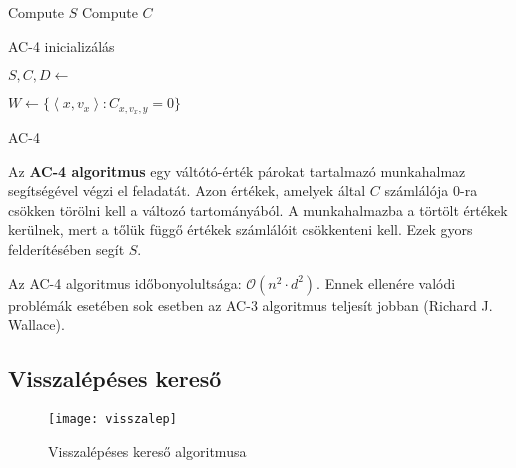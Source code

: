 \begin{algorithm}[H]
    {
        Compute $S$ \;
        Compute $C$ \;
        \;
    }
    \caption{AC-4 inicializálás}
\end{algorithm}

\begin{algorithm}[H]
    {
        $S, C, D \gets$  \;

        $W \gets \{\left<x, v_x \right> : C_{x,v_x,y} = 0\} $

        \;
    }
    \caption{AC-4}
\end{algorithm}

Az {\bf AC-4 algoritmus} egy váltótó-érték párokat tartalmazó munkahalmaz
segítségével végzi el feladatát. Azon értékek, amelyek által $C$ számlálója $0$-ra
csökken törölni kell a változó tartományából. A munkahalmazba a törtölt értékek
kerülnek, mert a tőlük függő értékek számlálóit csökkenteni kell. Ezek gyors
felderítésében segít $S$.

\begin{megjegyzes}
    Az AC-4 algoritmus időbonyolultsága: $\mathcal{O}(n^2 \cdot d^2)$. Ennek ellenére valódi
    problémák esetében sok esetben az AC-3 algoritmus teljesít jobban (Richard
    J.  Wallace).
\end{megjegyzes}

\subsection{Visszalépéses kereső}

\begin{figure}[H]
    \centering
    \texttt{[image: visszalep]}
    \caption{Visszalépéses kereső algoritmusa}
    \label{fig:visszalep}
\end{figure}
